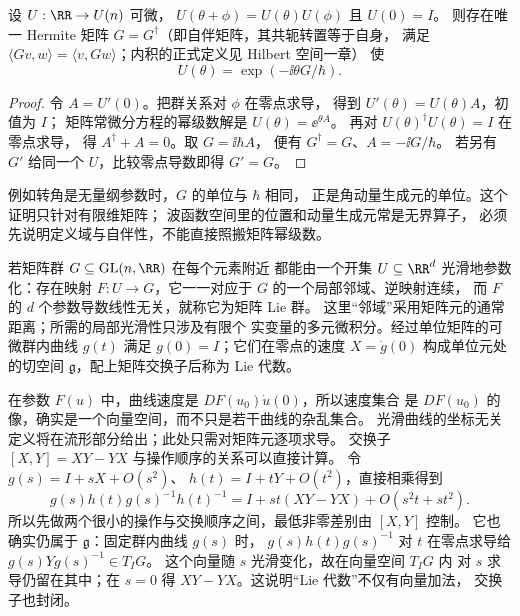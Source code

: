 \begin{proposition}[单参数酉变换的生成元]
设 \(U:\RR\to U(n)\) 可微，
\(U(\theta+\phi)=U(\theta)U(\phi)\) 且 \(U(0)=I\)。
则存在唯一 Hermite 矩阵 \(G=G^\dagger\)（即自伴矩阵，其共轭转置等于自身，
满足 \(\langle Gv,w\rangle=\langle v,Gw\rangle\)；内积的正式定义见 Hilbert 空间一章）
使
\[
U(\theta)=\exp(-\ii\theta G/\hbar).
\]
\end{proposition}
\begin{proof}
令 \(A=U'(0)\)。把群关系对 \(\phi\) 在零点求导，
得到 \(U'(\theta)=U(\theta)A\)，初值为 \(I\)；
矩阵常微分方程的幂级数解是 \(U(\theta)=\ee^{\theta A}\)。
再对 \(U(\theta)^\dagger U(\theta)=I\) 在零点求导，
得 \(A^\dagger+A=0\)。取 \(G=\ii\hbar A\)，
便有 \(G^\dagger=G\)、\(A=-\ii G/\hbar\)。
若另有 \(G'\) 给同一个 \(U\)，比较零点导数即得 \(G'=G\)。
\end{proof}

例如转角是无量纲参数时，\(G\) 的单位与 \(\hbar\) 相同，
正是角动量生成元的单位。这个证明只针对有限维矩阵；
波函数空间里的位置和动量生成元常是无界算子，
必须先说明定义域与自伴性，不能直接照搬矩阵幂级数。

\begin{definition}
若矩阵群 \(G\subseteq\operatorname{GL}(n,\RR)\) 在每个元素附近
都能由一个开集 \(U\subseteq\RR^d\) 光滑地参数化：存在映射
\(F:U\to G\)，它一一对应于 \(G\) 的一个局部邻域、逆映射连续，
而 \(F\) 的 \(d\) 个参数导数线性无关，就称它为矩阵 Lie 群。
这里“邻域”采用矩阵元的通常距离；所需的局部光滑性只涉及有限个
实变量的多元微积分。经过单位矩阵的可微群内曲线 \(g(t)\)
满足 \(g(0)=I\)；它们在零点的速度 \(X=\dot g(0)\)
构成单位元处的切空间 \(\mathfrak g\)，配上矩阵交换子后称为 Lie 代数。
\end{definition}

在参数 \(F(u)\) 中，曲线速度是 \(DF(u_0)\dot u(0)\)，所以速度集合
是 \(DF(u_0)\) 的像，确实是一个向量空间，而不只是若干曲线的杂乱集合。
光滑曲线的坐标无关定义将在流形部分给出；此处只需对矩阵元逐项求导。
交换子 \([X,Y]=XY-YX\) 与操作顺序的关系可以直接计算。
令 \(g(s)=I+sX+O(s^2)\)、
\(h(t)=I+tY+O(t^2)\)，直接相乘得到
\[
g(s)h(t)g(s)^{-1}h(t)^{-1}
=I+st(XY-YX)+O(s^2t+st^2).
\]
所以先做两个很小的操作与交换顺序之间，最低非零差别由 \([X,Y]\) 控制。
它也确实仍属于 \(\mathfrak g\)：固定群内曲线 \(g(s)\) 时，
\(g(s)h(t)g(s)^{-1}\) 对 \(t\) 在零点求导给
\(g(s)Yg(s)^{-1}\in T_I G\)。
这个向量随 \(s\) 光滑变化，故在向量空间 \(T_I G\) 内
对 \(s\) 求导仍留在其中；在 \(s=0\) 得
\(XY-YX\)。这说明“Lie 代数”不仅有向量加法，
交换子也封闭。


